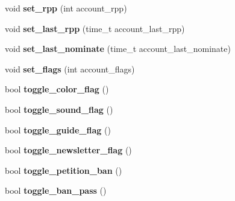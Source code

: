 \begin{DoxyCompactItemize}
\item 
\hypertarget{classaccount_a7eccafbf3cb4466ea52ce68d320d2646}{void {\bfseries set\-\_\-rpp} (int account\-\_\-rpp)}\label{classaccount_a7eccafbf3cb4466ea52ce68d320d2646}

\item 
\hypertarget{classaccount_ae40fb30ed0caf778d2f6b4582c1038f6}{void {\bfseries set\-\_\-last\-\_\-rpp} (time\-\_\-t account\-\_\-last\-\_\-rpp)}\label{classaccount_ae40fb30ed0caf778d2f6b4582c1038f6}

\item 
\hypertarget{classaccount_ace99c5470133f2226e7e211eb5367f48}{void {\bfseries set\-\_\-last\-\_\-nominate} (time\-\_\-t account\-\_\-last\-\_\-nominate)}\label{classaccount_ace99c5470133f2226e7e211eb5367f48}

\item 
\hypertarget{classaccount_ae92bb9373261e35aee1530697443afdc}{void {\bfseries set\-\_\-flags} (int account\-\_\-flags)}\label{classaccount_ae92bb9373261e35aee1530697443afdc}

\item 
\hypertarget{classaccount_a60bfacc5d1d16bb84fe77d64e473b9d8}{bool {\bfseries toggle\-\_\-color\-\_\-flag} ()}\label{classaccount_a60bfacc5d1d16bb84fe77d64e473b9d8}

\item 
\hypertarget{classaccount_a808b325e109c6fb8dd16ae750b8a6aef}{bool {\bfseries toggle\-\_\-sound\-\_\-flag} ()}\label{classaccount_a808b325e109c6fb8dd16ae750b8a6aef}

\item 
\hypertarget{classaccount_a432124b99cf1dd11873d546697a7cc8c}{bool {\bfseries toggle\-\_\-guide\-\_\-flag} ()}\label{classaccount_a432124b99cf1dd11873d546697a7cc8c}

\item 
\hypertarget{classaccount_a0d8cdd02f9bebd123b369ada7dc83656}{bool {\bfseries toggle\-\_\-newsletter\-\_\-flag} ()}\label{classaccount_a0d8cdd02f9bebd123b369ada7dc83656}

\item 
\hypertarget{classaccount_a31043390e24a539df779e806c1faaec5}{bool {\bfseries toggle\-\_\-petition\-\_\-ban} ()}\label{classaccount_a31043390e24a539df779e806c1faaec5}

\item 
\hypertarget{classaccount_af9ecc609d8f4fa1f84f7bf64e68a280c}{bool {\bfseries toggle\-\_\-ban\-\_\-pass} ()}\label{classaccount_af9ecc609d8f4fa1f84f7bf64e68a280c}


\end{DoxyCompactItemize}

